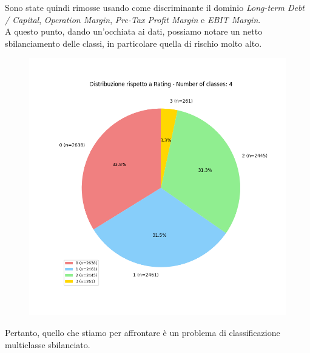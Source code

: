 \noindent Sono state quindi rimosse usando come discriminante il dominio \textit{Long-term Debt / Capital}, \textit{Operation Margin}, \textit{Pre-Tax Profit Margin} e \textit{EBIT Margin}. \\ A questo punto, dando un'occhiata ai dati, possiamo notare un netto sbilanciamento delle classi, in particolare quella di rischio molto alto.
\begin{figure}[H]
    \centering
    \includegraphics[scale=0.5]{img/class_imbalance.png}
\end{figure}
\noindent Pertanto, quello che stiamo per affrontare è un problema di classificazione multiclasse sbilanciato.